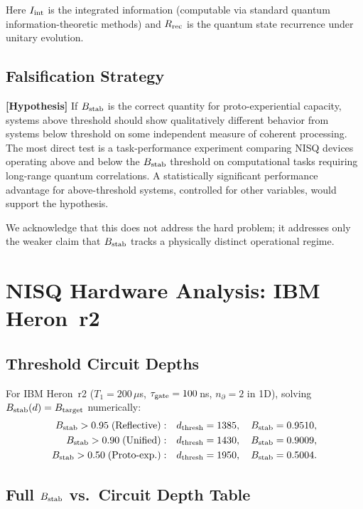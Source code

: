 \documentclass[12pt,letterpaper]{article}
\theoremstyle{definition}
\theoremstyle{remark}
\newcommand{\hypothesis}{\textbf{[Hypothesis]}}
\newcommand{\Bstab}{B_{\rm stab}}
\newcommand{\taugate}{\tau_{\rm gate}}
\begin{document}
\noindent Here $I_{\rm int}$ is the integrated information (computable via standard
quantum information-theoretic methods) and $R_{\rm rec}$ is the quantum state
recurrence under unitary evolution.

\subsection{Falsification Strategy}

\hypothesis{} If $\Bstab$ is the correct quantity for proto-experiential capacity,
systems above threshold should show qualitatively different behavior from systems below
threshold on some independent measure of coherent processing.
The most direct test is a task-performance experiment comparing NISQ devices operating
above and below the $\Bstab$ threshold on computational tasks requiring long-range
quantum correlations.
A statistically significant performance advantage for above-threshold systems,
controlled for other variables, would support the hypothesis.

We acknowledge that this does not address the hard problem; it addresses only the weaker
claim that $\Bstab$ tracks a physically distinct operational regime.

\section{NISQ Hardware Analysis: IBM Heron~r2}
\label{sec:hardware}

\subsection{Threshold Circuit Depths}

For IBM Heron~r2 ($T_1 = 200\,\mu$s, $\taugate = 100\,$ns, $n_\partial = 2$ in 1D),
solving $\Bstab(d) = B_{\rm target}$ numerically:
\begin{align}
\Bstab > 0.95\;(\text{Reflective}):&\quad d_{\rm thresh} = 1385,\quad\Bstab = 0.9510,\\
\Bstab > 0.90\;(\text{Unified}):&\quad d_{\rm thresh} = 1430,\quad\Bstab = 0.9009,\\
\Bstab > 0.50\;(\text{Proto-exp.}):&\quad d_{\rm thresh} = 1950,\quad\Bstab = 0.5004.
\end{align}

\subsection{Full \texorpdfstring{$\Bstab$}{B\_stab} vs.\ Circuit Depth Table}
\end{document}
